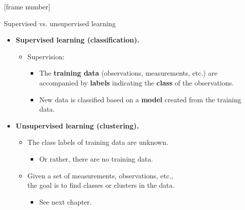 \documentclass[aspectratio=169,t,table]{beamer}
\begin{document}
  {
    [frame number]
    \begin{frame}{Supervised vs. unsupervised learning}
        \begin{itemize}
            \item \textbf{\color{airforceblue}Supervised learning (classification).}
            \begin{itemize}
              \item Supervision:
              \begin{itemize}
                \item The \textbf{training data} (observations, measurements, etc.) are accompanied by \textbf{labels} indicating the \textbf{class} of the observations.
                \item New data is classified based on a \textbf{model} created from the training data.
              \end{itemize}
            \end{itemize}
            \item \textbf{\color{airforceblue}Unsupervised learning (clustering).}
            \begin{itemize}
              \item The class labels of training data are unknown.
              \begin{itemize}
                \item Or rather, there are no training data.
              \end{itemize}
            \end{itemize}
            \begin{itemize}
              \item Given a set of measurements, observations, etc., \\ the goal is to find classes or clusters in the data.
              \begin{itemize}
                \item See next chapter.
              \end{itemize}
            \end{itemize}
        \end{itemize}
    \end{frame}
  }
\end{document}
